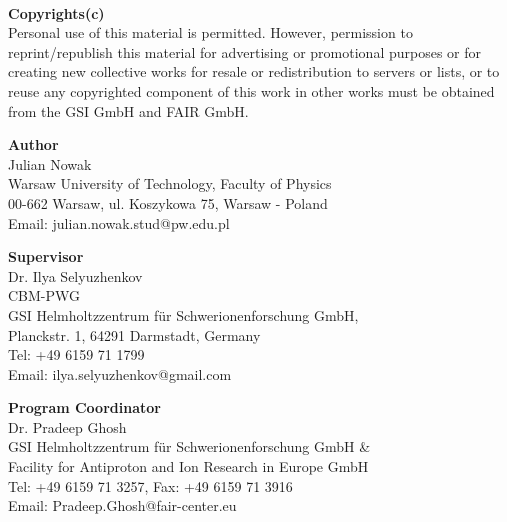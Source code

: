 \documentclass[12pt,a4paper]{report}
\begin{document}
\makeititle

\setcounter{tocdepth}{3} %

\clearpage%
\thispagestyle{empty}%
~ %
\newpage

\thispagestyle{empty}
\noindent\textbf{Copyrights(c)}\\
Personal use of this material is permitted. However, permission to reprint/republish this material for advertising or promotional purposes or for creating new collective works for resale or redistribution to servers or lists, or to reuse any copyrighted component of this work in other works must be obtained from the GSI GmbH and FAIR GmbH.\\
\vspace{0.8cm}

\noindent\textbf{Author}\\
Julian Nowak\\
Warsaw University of Technology, Faculty of Physics\\
00-662 Warsaw, ul. Koszykowa 75, Warsaw - Poland\\
Email: julian.nowak.stud@pw.edu.pl \\
\vspace{0.8cm}

\noindent\textbf{Supervisor}\\
Dr. Ilya Selyuzhenkov\\
CBM-PWG\\
GSI Helmholtzzentrum f\"{u}r Schwerionenforschung GmbH,\\
Planckstr. 1, 64291 Darmstadt, Germany\\
Tel: +49 6159 71 1799\\
Email: ilya.selyuzhenkov@gmail.com \\
\vspace{0.8cm}

\noindent\textbf{Program Coordinator}\\
Dr. Pradeep Ghosh\\
GSI Helmholtzzentrum f\"{u}r Schwerionenforschung GmbH \& \\
Facility for Antiproton and Ion Research in Europe GmbH\\
Tel: +49 6159 71 3257, Fax: +49 6159 71 3916 \\
Email: Pradeep.Ghosh@fair-center.eu\\
\vspace{0.8cm}
\end{document}
